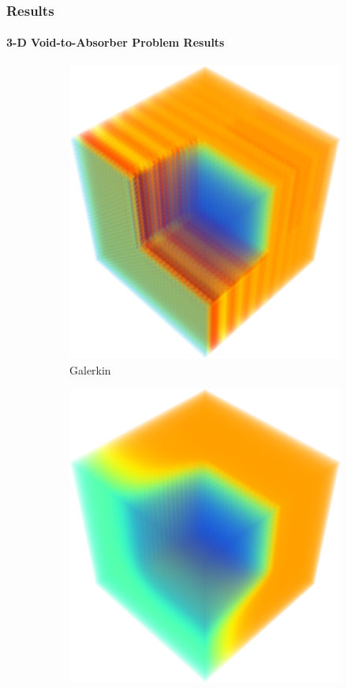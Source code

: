 \documentclass{beamer}
\begin{document}
\begin{frame}
\frametitle{Results}
\framesubtitle{3-D Void-to-Absorber Problem Results}

\begin{figure}[h]
   \centering
   \begin{subfigure}{0.45\textwidth}
      \includegraphics[width=\textwidth]{./figures/Gal_3D.png}
      \caption{Galerkin}
   \end{subfigure}
   \begin{subfigure}{0.45\textwidth}
      \includegraphics[width=\textwidth]{./figures/GalFCT_3D.png}

\end{subfigure}
\end{figure}
\end{frame}
\end{document}
